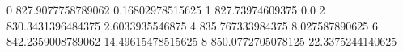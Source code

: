 0 827.9077758789062 0.16802978515625
1 827.73974609375 0.0
2 830.3431396484375 2.6033935546875
4 835.767333984375 8.027587890625
6 842.2359008789062 14.49615478515625
8 850.0772705078125 22.3375244140625
